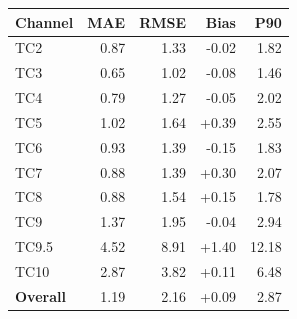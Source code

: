 \begin{tabular}{lrrrr}
\hline
Channel & MAE & RMSE & Bias & P90 \\
\hline
TC2 & 0.87 & 1.33 & -0.02 & 1.82 \\
TC3 & 0.65 & 1.02 & -0.08 & 1.46 \\
TC4 & 0.79 & 1.27 & -0.05 & 2.02 \\
TC5 & 1.02 & 1.64 & +0.39 & 2.55 \\
TC6 & 0.93 & 1.39 & -0.15 & 1.83 \\
TC7 & 0.88 & 1.39 & +0.30 & 2.07 \\
TC8 & 0.88 & 1.54 & +0.15 & 1.78 \\
TC9 & 1.37 & 1.95 & -0.04 & 2.94 \\
TC9.5 & 4.52 & 8.91 & +1.40 & 12.18 \\
TC10 & 2.87 & 3.82 & +0.11 & 6.48 \\
\hline
\textbf{Overall} & 1.19 & 2.16 & +0.09 & 2.87 \\
\hline
\end{tabular}

